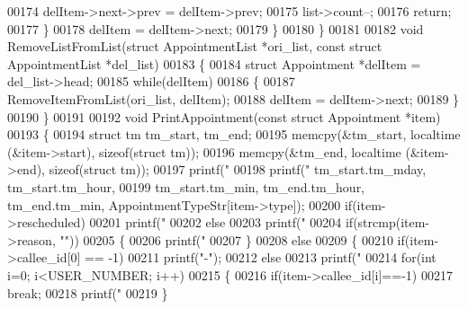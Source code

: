 \begin{DoxyCode}
00174                 delItem->next->prev = delItem->prev;
00175             list->count--;
00176             \textcolor{keywordflow}{return};
00177         \}
00178         delItem = delItem->next;
00179     \}
00180 \}
00181 
00182 \textcolor{keywordtype}{void} RemoveListFromList(\textcolor{keyword}{struct} AppointmentList *ori\_list, \textcolor{keyword}{const} \textcolor{keyword}{struct} 
      AppointmentList *del\_list)
00183 \{
00184     \textcolor{keyword}{struct }Appointment *delItem = del\_list->head;
00185     \textcolor{keywordflow}{while}(delItem)
00186     \{
00187         RemoveItemFromList(ori\_list, delItem);
00188         delItem = delItem->next;
00189     \}
00190 \}
00191 
00192 \textcolor{keywordtype}{void} PrintAppointment(\textcolor{keyword}{const} \textcolor{keyword}{struct} Appointment *item)
00193 \{
00194     \textcolor{keyword}{struct }tm tm\_start, tm\_end;
00195     memcpy(&tm\_start, localtime (&item->start), \textcolor{keyword}{sizeof}(\textcolor{keyword}{struct} tm));
00196     memcpy(&tm\_end, localtime (&item->end), \textcolor{keyword}{sizeof}(\textcolor{keyword}{struct} tm));
00197     printf(\textcolor{stringliteral}{"%
00198     printf(\textcolor{stringliteral}{"%
      tm\_start.tm\_mday, tm\_start.tm\_hour,
00199      tm\_start.tm\_min, tm\_end.tm\_hour, tm\_end.tm\_min, AppointmentTypeStr[item->type]);
00200     \textcolor{keywordflow}{if}(item->rescheduled)
00201         printf(\textcolor{stringliteral}{"%
00202     \textcolor{keywordflow}{else}
00203         printf(\textcolor{stringliteral}{"%
00204     \textcolor{keywordflow}{if}(strcmp(item->reason, \textcolor{stringliteral}{""}))
00205     \{
00206         printf(\textcolor{stringliteral}{" %
00207     \}
00208     \textcolor{keywordflow}{else}
00209     \{
00210         \textcolor{keywordflow}{if}(item->callee\_id[0] == -1)
00211             printf(\textcolor{stringliteral}{"-"});
00212         \textcolor{keywordflow}{else}
00213             printf(\textcolor{stringliteral}{"%
00214         \textcolor{keywordflow}{for}(\textcolor{keywordtype}{int} i=0; i<USER_NUMBER; i++)
00215         \{
00216             \textcolor{keywordflow}{if}(item->callee\_id[i]==-1)
00217                 \textcolor{keywordflow}{break};
00218             printf(\textcolor{stringliteral}{"%
00219         \}
}}}}}}}
\end{DoxyCode}
